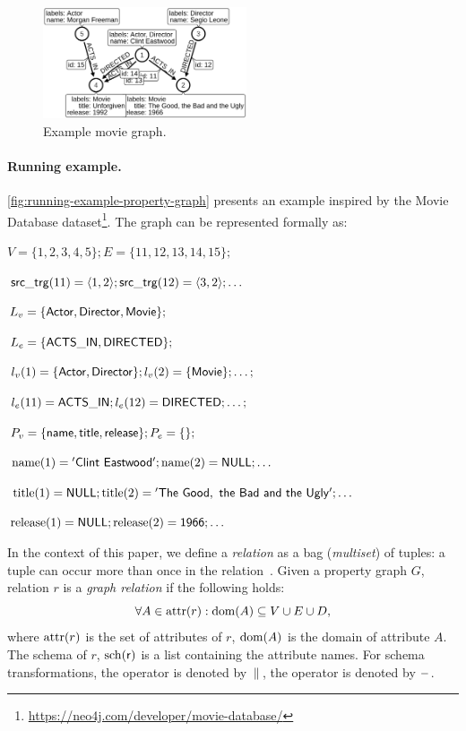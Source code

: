 \begin{figure}
	\centering
	\includegraphics[width=6cm]{figures/movie-graph}
	\caption{Example movie graph.}
	\label{fig:running-example-property-graph}
\end{figure}

\paragraph{Running example.} \autoref{fig:running-example-property-graph} presents an example inspired by the Movie Database dataset\footnote{\url{https://neo4j.com/developer/movie-database/}}. The graph can be represented formally as:

\begin{minipage}{\textwidth}
	$V=\{1, 2, 3, 4, 5\}; E=\{11,12,13,14,15\};$
	
	$\mathsf{src\_trg}(11) = \langle 1, 2 \rangle; \mathsf{src\_trg}(12) = \langle 3, 2 \rangle; \ldots$

	$L_v = \{\mathsf{Actor}, \mathsf{Director}, \mathsf{Movie}\};$

	$L_e = \{\mathsf{ACTS\_IN}, \mathsf{DIRECTED}\};$

	$l_v(1) = \{\mathsf{Actor}, \mathsf{Director}\}; l_v(2) = \{\mathsf{Movie}\}; \ldots;$

	$l_e(11) = \mathsf{ACTS\_IN}; l_e(12) = \mathsf{DIRECTED}; \ldots;$

	$P_v = \{\mathsf{name}, \mathsf{title}, \mathsf{release}\}; P_e = \{\};$

	$\mathrm{name}(1) = \mathsf{'Clint~Eastwood'}; \mathrm{name}(2) = \mathsf{NULL}; \ldots$

	$\mathrm{title}(1) = \mathsf{NULL}; \mathrm{title}(2) = \mathsf{'The~Good,~the~Bad~and~the~Ugly'}; \ldots$
	
	$\mathrm{release}(1) = \mathsf{NULL}; \mathrm{release}(2) = \mathsf{1966}; \ldots$
\end{minipage}

In the context of this paper, we define a \emph{relation} as a bag (\emph{multiset}) of tuples: a tuple can occur more than once in the relation~\cite{DBLP:books/daglib/0020812}.
Given a property graph $G$, relation $r$ is a \emph{graph relation} if the following holds:
$$\forall A \in \mathrm{attr}(r): \mathrm{dom}(A) \subseteq V \cup E \cup D,$$
where $\mathrm{attr}(r)$ is the set of attributes of $r$, $\mathrm{dom}(A)$ is the domain of attribute $A$. The schema of $r$, $\mathrm{sch}(\mathsf{r})$ is a list containing the attribute names. For schema transformations, the \appendtext operator is denoted by $\,\|\,$, the \removetext operator is denoted by $-$.

